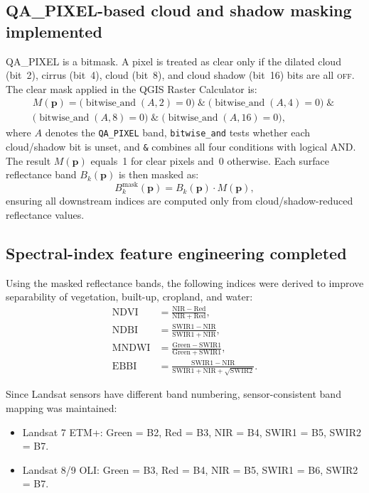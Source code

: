 \subsection{QA\_PIXEL-based cloud and shadow masking implemented}
QA\_PIXEL is a bitmask. A pixel is treated as clear only if the dilated cloud (bit~2), cirrus (bit~4), cloud (bit~8), and cloud shadow (bit~16) bits are all \textsc{off}. The clear mask applied in the QGIS Raster Calculator is:
\begin{multline}
M(\mathbf{p}) =
\bigl(\operatorname{bitwise\_and}(A,2)=0\bigr)
\;\&\;
\bigl(\operatorname{bitwise\_and}(A,4)=0\bigr)
\;\&\; \\
\bigl(\operatorname{bitwise\_and}(A,8)=0\bigr)
\;\&\;
\bigl(\operatorname{bitwise\_and}(A,16)=0\bigr),
\end{multline}
where $A$ denotes the \texttt{QA\_PIXEL} band, \texttt{bitwise\_and} tests whether each cloud/shadow bit is unset, and \texttt{\&} combines all four conditions with logical AND. The result $M(\mathbf{p})$ equals~1 for clear pixels and~0 otherwise. Each surface reflectance band $B_k(\mathbf{p})$ is then masked as:
\begin{equation}
B^{\text{mask}}_{k}(\mathbf{p}) = B_{k}(\mathbf{p}) \cdot M(\mathbf{p}),
\end{equation}
ensuring all downstream indices are computed only from cloud/shadow-reduced reflectance values.

\subsection{Spectral-index feature engineering completed}
Using the masked reflectance bands, the following indices were derived to improve separability of vegetation, built-up, cropland, and water:
\begin{align}
\mathrm{NDVI}  &= \frac{\mathrm{NIR}-\mathrm{Red}}{\mathrm{NIR}+\mathrm{Red}},\\[4pt]
\mathrm{NDBI}  &= \frac{\mathrm{SWIR1}-\mathrm{NIR}}{\mathrm{SWIR1}+\mathrm{NIR}},\\[4pt]
\mathrm{MNDWI} &= \frac{\mathrm{Green}-\mathrm{SWIR1}}{\mathrm{Green}+\mathrm{SWIR1}},\\[4pt]
\mathrm{EBBI}  &= \frac{\mathrm{SWIR1}-\mathrm{NIR}}{\mathrm{SWIR1}+\mathrm{NIR}+\sqrt{\mathrm{SWIR2}}}.
\end{align}

Since Landsat sensors have different band numbering, sensor-consistent band mapping was maintained:
\begin{itemize}
  \item Landsat 7 ETM+: Green = B2, Red = B3, NIR = B4, SWIR1 = B5, SWIR2 = B7.
  \item Landsat 8/9 OLI: Green = B3, Red = B4, NIR = B5, SWIR1 = B6, SWIR2 = B7.
\end{itemize}

